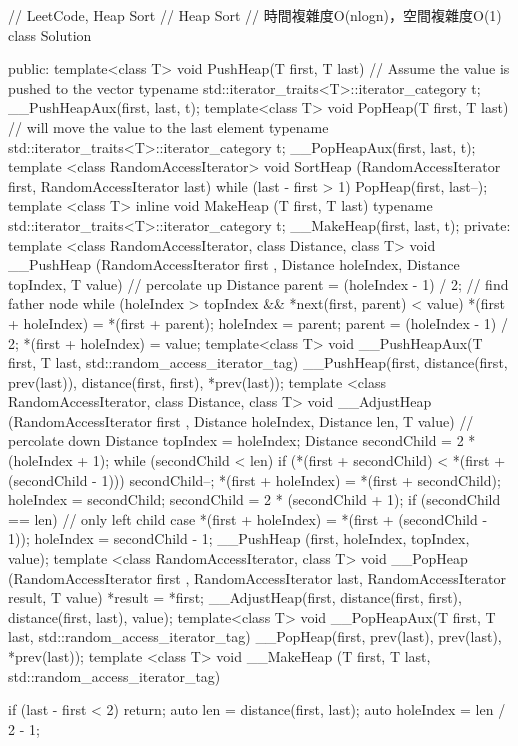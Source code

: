 \begin{Code}
// LeetCode, Heap Sort
// Heap Sort
// 時間複雜度O(nlogn)，空間複雜度O(1)
class Solution {
public:
    template<class T>
        void PushHeap(T first, T last)
    {
        // Assume the value is pushed to the vector
        typename std::iterator_traits<T>::iterator_category t;
        __PushHeapAux(first, last, t);
    }
    template<class T>
        void PopHeap(T first, T last)
    {
        // will move the value to the last element
        typename std::iterator_traits<T>::iterator_category t;
        __PopHeapAux(first, last, t);
    }
    template <class RandomAccessIterator>
        void SortHeap (RandomAccessIterator first, RandomAccessIterator last)
    {
        while (last - first > 1)
            PopHeap(first, last--);
    }
    template <class T>
        inline void MakeHeap (T first, T last)
    {
        typename std::iterator_traits<T>::iterator_category t;
        __MakeHeap(first, last, t);
    }
private:
    template <class RandomAccessIterator, class Distance, class T>
    void __PushHeap (RandomAccessIterator first
                    , Distance holeIndex, Distance topIndex, T value)
    {
        // percolate up
        Distance parent = (holeIndex - 1) / 2; // find father node
        while (holeIndex > topIndex && *next(first, parent) < value)
        {
            *(first + holeIndex) = *(first + parent);
            holeIndex = parent;
            parent = (holeIndex - 1) / 2;
        }
        *(first + holeIndex) = value;
    }
    template<class T>
        void __PushHeapAux(T first, T last, std::random_access_iterator_tag)
    {
        __PushHeap(first, distance(first, prev(last)), distance(first, first), *prev(last));
    }
    template <class RandomAccessIterator, class Distance, class T>
    void __AdjustHeap (RandomAccessIterator first
                      , Distance holeIndex, Distance len, T value)
    {
        // percolate down
        Distance topIndex = holeIndex;
        Distance secondChild = 2 * (holeIndex + 1);
        while (secondChild < len)
        {
            if (*(first + secondChild) < *(first + (secondChild - 1)))
                secondChild--;
            *(first + holeIndex) = *(first + secondChild);
            holeIndex = secondChild;
            secondChild = 2 * (secondChild + 1);
        }
        if (secondChild == len) // only left child case
        {
            *(first + holeIndex) = *(first + (secondChild - 1));
            holeIndex = secondChild - 1;
        }
        __PushHeap (first, holeIndex, topIndex, value);
    }
    template <class RandomAccessIterator, class T>
    void __PopHeap (RandomAccessIterator first
                   , RandomAccessIterator last, RandomAccessIterator result, T value)
    {
        *result = *first;
        __AdjustHeap(first, distance(first, first), distance(first, last), value);
    }
    template<class T>
        void __PopHeapAux(T first, T last, std::random_access_iterator_tag)
    {
        __PopHeap(first, prev(last), prev(last), *prev(last));
    }
    template <class T>
        void __MakeHeap (T first, T last, std::random_access_iterator_tag)
    {
        if (last - first < 2) return;
        auto len = distance(first, last);
        auto holeIndex = len / 2 - 1;

}}
\end{Code}
